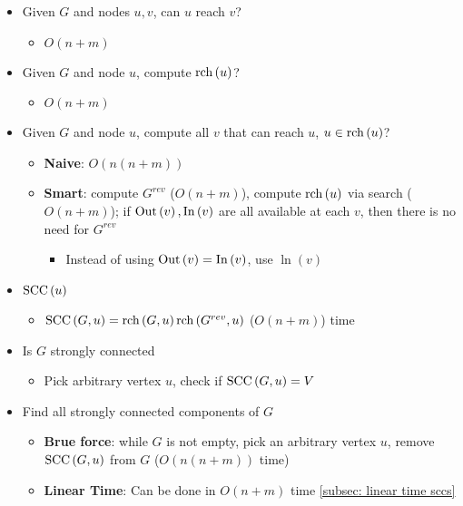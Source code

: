   \begin{itemize}
    \item Given $ G $ and nodes $ u, v $, can $ u $ reach $ v $?
    \begin{itemize}
      \item $ O\left( n + m \right) $
    \end{itemize}
    \item Given $ G $ and node $ u $, compute $ \operatorname{rch}\left( u \right) $?
    \begin{itemize}
      \item $ O\left( n + m \right) $
    \end{itemize}

    \item Given $ G $ and node $ u $, compute all $ v $ that can reach $ u $,
    $ u \in \operatorname{rch}\left( u \right) $?
    \begin{itemize}
      \item \textbf{Naive}: $ O\left( n \left( n + m \right) \right) $
      \item \textbf{Smart}: compute $ G^{rev} $ ($ O\left( n + m \right) $),
      compute $ \operatorname{rch}\left( u \right) $ via search ($ O\left( n + m \right) $);
      if $ \operatorname{Out}\left( v \right), \operatorname{In}\left( v \right) $ are all available at
      each $ v $, then there is no need for $ G^{rev} $
      \begin{itemize}
        \item Instead of using $ \operatorname{Out}\left( v \right) = \operatorname{In}\left( v \right) $,
        use $ \ln\left( v \right) $
      \end{itemize}
    \end{itemize}

    \item $ \operatorname{SCC}\left( u \right) $
    \begin{itemize}
      \item $ \operatorname{SCC}\left( G, u \right) = \operatorname{rch}\left( G, u \right) \operatorname{rch} \left( G^{rev}, u \right) $
      ($ O\left( n + m \right) $) time
    \end{itemize}

    \item Is $ G $ strongly connected
    \begin{itemize}
      \item Pick arbitrary vertex $ u $, check if
      $ \operatorname{SCC}\left( G, u \right) = V $
    \end{itemize}

    \item Find all strongly connected components of $ G $
    \begin{itemize}
      \item \textbf{Brue force}: while $ G $ is not empty, pick an arbitrary
      vertex $ u $, remove $ \operatorname{SCC}\left( G,u \right) $ from $ G $
      ($ O\left( n \left( n + m \right) \right) $ time)
      \item \textbf{Linear Time}: Can be done in $ O\left( n + m \right) $ time
      \ref{subsec: linear time sccs}
    \end{itemize}
  \end{itemize}

